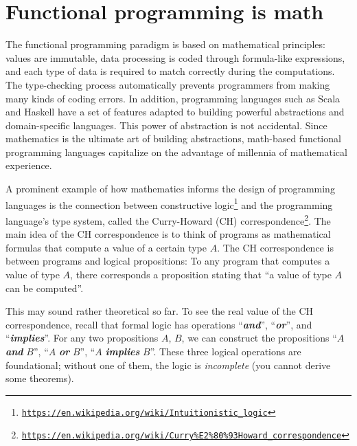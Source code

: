 \section{Functional programming is math}

The functional programming paradigm is based on mathematical principles:
values are immutable, data processing is coded through formula-like
expressions, and each type of data is required to match correctly
during the computations. The type-checking process automatically prevents
programmers from making many kinds of coding errors. In addition,
programming languages such as Scala and Haskell have a set of features
adapted to building powerful abstractions and domain-specific languages.
This power of abstraction is not accidental. Since mathematics is
the ultimate art of building abstractions, math-based functional programming
languages capitalize on the advantage of millennia of mathematical
experience.

A prominent example of how mathematics informs the design of programming
languages is the connection between constructive logic\footnote{\texttt{\href{https://en.wikipedia.org/wiki/Intuitionistic_logic}{https://en.wikipedia.org/wiki/Intuitionistic\_logic}}}
and the programming language\textsf{'}s type system, called the Curry-Howard
(CH) correspondence\footnote{\texttt{\href{https://en.wikipedia.org/wiki/Curry\%E2\%80\%93Howard_correspondence}{https://en.wikipedia.org/wiki/Curry\%E2\%80\%93Howard\_correspondence}}}.
The main idea of the CH correspondence
is to think of programs as mathematical formulas that compute a value
of a certain type $A$. The CH correspondence is between programs
and logical propositions: To any program that computes a value of
type $A$, there corresponds a proposition stating that \textsf{``}a value
of type $A$ can be computed\textsf{''}.

This may sound rather theoretical so far. To see the real value of
the CH correspondence, recall that formal logic has operations \textsf{``}\textbf{\emph{and}}\textsf{''},
\textsf{``}\textbf{\emph{or}}\textsf{''}, and \textsf{``}\textbf{\emph{implies}}\textsf{''}. For any
two propositions $A$, $B$, we can construct the propositions \textsf{``}$A$
\textbf{\emph{and}} $B$\textsf{''}, \textsf{``}$A$ \textbf{\emph{or}} $B$\textsf{''}, \textsf{``}$A$
\textbf{\emph{implies}} $B$\textsf{''}. These three logical operations are
foundational; without one of them, the logic is \emph{incomplete}
(you cannot derive some theorems).

